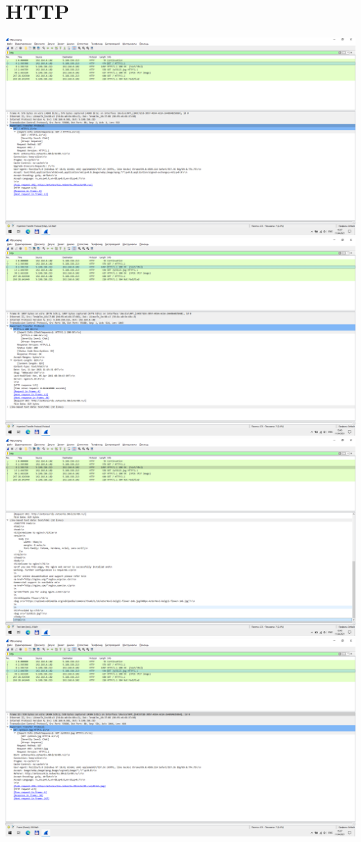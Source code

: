 \section{HTTP}
\includegraphics{screenshots/http_get_text_request_1}
\includegraphics{screenshots/http_get_text_response_1}
\includegraphics{screenshots/http_get_text_response_2}
\includegraphics{screenshots/http_get_jpg_request_1}
